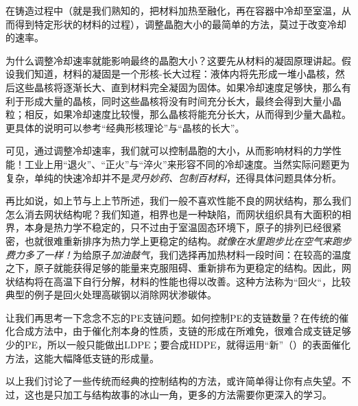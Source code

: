 在铸造过程中（就是我们熟知的，把材料加热至融化，再在容器中冷却至室温，从而得到特定形状的材料的过程），调整晶胞大小的最简单的方法，莫过于改变冷却的速率。

为什么调整冷却速率就能影响最终的晶胞大小？这要先从材料的凝固原理讲起。假设我们知道，材料的凝固是一个形核-长大过程：液体内将先形成一堆小晶核，然后这些晶核将逐渐长大、直到材料完全凝固为固体。如果冷却速度足够快，那么有利于形成大量的晶核，同时这些晶核将没有时间充分长大，最终会得到大量小晶粒；相反，如果冷却速度比较慢，那么晶核将能充分长大，从而得到少量大晶粒。更具体的说明可以参考“经典形核理论”与“晶核的长大”。

可见，通过调整冷却速率，我们就可以控制晶胞的大小，从而影响材料的力学性能！工业上用“退火”、“正火”与“淬火”来形容不同的冷却速度。当然实际问题更为复杂，单纯的快速冷却并不是\textsl{灵丹妙药、包制百材料}，还得具体问题具体分析。

再比如说，如上节与上上节所述，我们一般不喜欢性能不良的网状结构，那么我们怎么消去网状结构呢？我们知道，相界也是一种缺陷，而网状组织具有大面积的相界，本身是热力学不稳定的，只不过由于室温固态环境下，原子的排列已经很紧密，也就很难重新排序为热力学上更稳定的结构。\textsl{就像在水里跑步比在空气来跑步费力多了一样！}为给原子\textsl{加油鼓气}，我们选择再加热材料一段时间：在较高的温度之下，原子就能获得足够的能量来克服阻碍、重新排布为更稳定的结构。因此，网状结构将在高温下自行分解，材料的性能也得以改善。这种方法称为“回火“，比较典型的例子是回火处理高碳钢以消除网状渗碳体。

让我们再思考一下念念不忘的PE支链问题。如何控制PE的支链数量？在传统的催化合成方法中，由于催化剂本身的性质，支链的形成在所难免，很难合成支链足够少的PE，所以一般只能做出LDPE；要合成HDPE，就得运用“新”（）的表面催化方法，这能大幅降低支链的形成量。

以上我们讨论了一些传统而经典的控制结构的方法，或许简单得让你有点失望。不过，这也是只加工与结构故事的冰山一角，更多的方法需要你更深入的学习。


